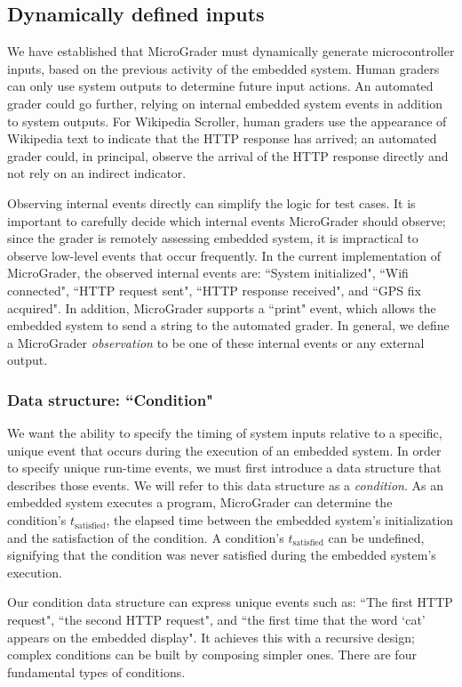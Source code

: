 \documentclass[12pt]{article}
\begin{document}
\subsection{Dynamically defined inputs}
We have established that MicroGrader must dynamically generate microcontroller inputs, based on the previous activity of the embedded system.  Human graders can only use system outputs to determine future input actions.  An automated grader could go further, relying on internal embedded system events in addition to system outputs.  For Wikipedia Scroller, human graders use the appearance of Wikipedia text to indicate that the HTTP response has arrived; an automated grader could, in principal, observe the arrival of the HTTP response directly and not rely on an indirect indicator.

Observing internal events directly can simplify the logic for test cases.  It is important to carefully decide which internal events MicroGrader should observe; since the grader is remotely assessing embedded system, it is impractical to observe low-level events that occur frequently.  In the current implementation of MicroGrader, the observed internal events are: ``System initialized", ``Wifi connected", ``HTTP request sent", ``HTTP response received", and ``GPS fix acquired".  In addition, MicroGrader supports a ``print" event, which allows the embedded system to send a string to the automated grader.  In general, we define a MicroGrader \textit{observation} to be one of these internal events or any external output.

\subsubsection{Data structure: ``Condition"}
\label{sec:condition}
We want the ability to specify the timing of system inputs relative to a specific, unique event that occurs during the execution of an embedded system.  In order to specify unique run-time events, we must first introduce a data structure that describes those events.  We will refer to this data structure as a \textit{condition}.  As an embedded system executes a program, MicroGrader can determine the condition's $t_{\text{satisfied}}$, the elapsed time between the embedded system's initialization and the satisfaction of the condition.  A condition's $t_{\text{satisfied}}$ can be undefined, signifying that the condition was never satisfied during the embedded system's execution.

Our condition data structure can express unique events such as: ``The first HTTP request", ``the second HTTP request", and ``the first time that the word `cat' appears on the embedded display".  It achieves this with a recursive design; complex conditions can be built by composing simpler ones.  There are four fundamental types of conditions.
\end{document}
